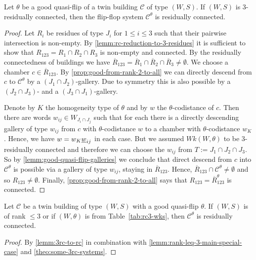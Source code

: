 \begin{lemm}
	Let $\theta$ be a good quasi-flip of a twin building $\mathcal C$ of type $(W,S)$. If $(W,S)$ is 3-residually connected, then the flip-flop system $\mathcal C^\theta$ is residually connected.

	\begin{proof}
		Let $R_i$ be residues of type $J_i$ for $1 \leq i \leq 3$ such that their pairwise intersection is non-empty. By \ref{lemm:rc-reduction-to-3-residues} it is sufficient to show that $R_{123} = R_1 \cap R_2 \cap R_3$ is non-empty and connected. By the residually connectedness of buildings we have $\overline R_{123} = \overline R_1 \cap \overline R_2 \cap \overline R_3 \neq \emptyset$. We choose a chamber $c \in \overline R_{123}$. By \ref{prop:good-from-rank-2-to-all} we can directly descend from $c$ to $\mathcal C^\theta$ by a $(J_1 \cap J_2)$-gallery. Due to symmetry this is also possible by a $(J_2 \cap J_3)$- and a $(J_3 \cap J_1)$-gallery.

		Denote by $K$ the homogeneity type of $\theta$ and by $w$ the $\theta$-codistance of $c$. Then there are words $w_{ij} \in W_{J_i \cap J_j}$ such that for each there is a directly descending gallery of type $w_{ij}$ from $c$ with $\theta$-codistance $w$ to a chamber with $\theta$-codistance $w_K$.
		Hence, we have $w = w_K \underline{w}_{ij}$ in each case. But we assumed $Wk(W,\theta)$ to be 3-residually connected and therefore we can choose the $w_{ij}$ from $T := J_1 \cap J_2 \cap J_3$. So by \ref{lemm:good-quasi-flip-galleries} we conclude that direct descend from $c$ into $\mathcal C^\theta$ is possible via a gallery of type $w_{ij}$, staying in $\overline R_{123}$. Hence, $\overline R_{123} \cap \mathcal C^\theta \neq \emptyset$ and so $R_{123} \neq \emptyset$. Finally, \ref{prop:good-from-rank-2-to-all} says that $R_{123} = \overline R_{123}^\theta$ is connected.
	\end{proof}
\end{lemm}

\begin{coro}
	Let $\mathcal C$ be a twin building of type $(W,S)$ with a good quasi-flip $\theta$. If $(W,S)$ is of rank $\leq 3$ or if $(W,\theta)$ is from Table~\ref{tab:rc3-wks}, then $\mathcal C^\theta$ is residually connected.

	\begin{proof}
		By \ref{lemm:3rc-to-rc} in combination with \ref{lemm:rank-leq-3-main-special-case} and \ref{theo:some-3rc-systems}.
	\end{proof}
\end{coro}